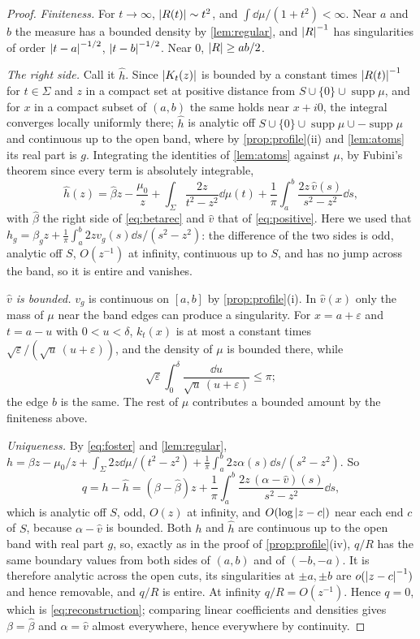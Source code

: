 \begin{proof}
\emph{Finiteness.} For $t\to\infty$, $\left|R(t)\right|\sim t^2$, and
$\int\dd\mu/(1+t^2)<\infty$. Near $a$ and $b$ the measure has a bounded
density by \cref{lem:regular}, and $\left|R\right|^{-1}$ has singularities of
order $\left|t-a\right|^{-1/2}$, $\left|t-b\right|^{-1/2}$. Near $0$, $\left|R\right|\ge ab/2$.

\emph{The right side.} Call it $\hat h$. Since $\left|K_t(z)\right|$ is bounded by
a constant times $\left|R(t)\right|^{-1}$ for $t\in\Sigma$ and $z$ in a compact set
at positive distance from $S\cup\{0\}\cup\operatorname{supp}\mu$, and for
$x$ in a compact subset of $(a,b)$ the same holds near $x+i0$, the integral
converges locally uniformly there; $\hat h$ is analytic off
$S\cup\{0\}\cup\operatorname{supp}\mu\cup-\operatorname{supp}\mu$ and
continuous up to the open band, where by \cref{prop:profile}(ii) and
\cref{lem:atoms} its real part is $g$. Integrating the identities of
\cref{lem:atoms} against $\mu$, by Fubini's theorem since every term is
absolutely integrable,
\[
\hat h(z)=\hat\beta z-\frac{\mu_0}z+\int_\Sigma\frac{2z}{t^2-z^2}\dd\mu(t)
+\frac1\pi\int_a^b\frac{2z\,\hat v(s)}{s^2-z^2}\dd s ,
\]
with $\hat\beta$ the right side of \eqref{eq:betarec} and $\hat v$ that of
\eqref{eq:positive}. Here we used that $h_g=\beta_gz+\frac1\pi\int_a^b
2zv_g(s)\dd s/(s^2-z^2)$: the difference of the two sides is odd, analytic
off $S$, $O(z^{-1})$ at infinity, continuous up to $S$, and has no jump
across the band, so it is entire and vanishes.

\emph{$\hat v$ is bounded.} $v_g$ is continuous on $[a,b]$ by
\cref{prop:profile}(i). In $\hat v(x)$ only the mass of $\mu$ near the band
edges can produce a singularity. For $x=a+\varepsilon$ and $t=a-u$ with
$0<u<\delta$, $k_t(x)$ is at most a constant times
$\sqrt\varepsilon/(\sqrt u\,(u+\varepsilon))$, and the density of $\mu$ is
bounded there, while
\[
\sqrt\varepsilon\int_0^\delta\frac{\dd u}{\sqrt u\,(u+\varepsilon)}\le\pi;
\]
the edge $b$ is the same. The rest of $\mu$ contributes a bounded amount by
the finiteness above.

\emph{Uniqueness.} By \eqref{eq:foster} and \cref{lem:regular},
$h=\beta z-\mu_0/z+\int_\Sigma2z\dd\mu/(t^2-z^2)+\frac1\pi\int_a^b2z\alpha(s)
\dd s/(s^2-z^2)$. So
\[
q=h-\hat h=(\beta-\hat\beta)z+\frac1\pi\int_a^b\frac{2z\,(\alpha-\hat v)(s)}{s^2-z^2}\dd s ,
\]
which is analytic off $S$, odd, $O(z)$ at infinity, and $O(\log\left|z-c\right|)$
near each end $c$ of $S$, because $\alpha-\hat v$ is bounded. Both $h$ and
$\hat h$ are continuous up to the open band with real part $g$, so, exactly
as in the proof of \cref{prop:profile}(iv), $q/R$ has the same boundary
values from both sides of $(a,b)$ and of $(-b,-a)$. It is therefore analytic
across the open cuts, its singularities at $\pm a,\pm b$ are
$o(\left|z-c\right|^{-1})$ and hence removable, and $q/R$ is entire. At infinity
$q/R=O(z^{-1})$. Hence $q=0$, which is \eqref{eq:reconstruction}; comparing
linear coefficients and densities gives $\beta=\hat\beta$ and
$\alpha=\hat v$ almost everywhere, hence everywhere by continuity.
\end{proof}

